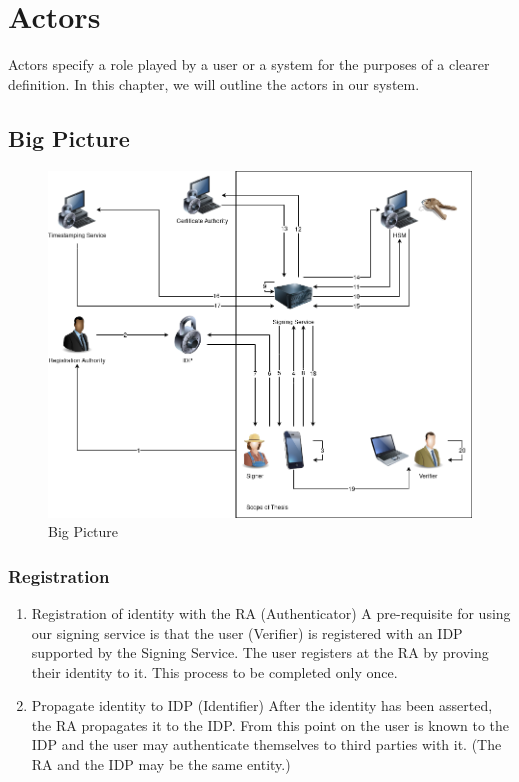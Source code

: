 \chapter{Actors}
\label{ch:actors}

Actors specify a role played by a user or a system for the purposes of a clearer definition.
In this chapter, we will outline the actors in our system.

\begin{landscape}
    \section{Big Picture}\label{sec:big-picture}
    \begin{figure}[H]
        \begin{center}
            \includegraphics[scale=0.55]{images/BigPicture.png}
            \caption{Big Picture}
            \label{fig:bigpicture}
        \end{center}
    \end{figure}
\end{landscape}

\subsection{Registration}\label{subsec:registration}
\begin{enumerate}
    \item Registration of identity with the \gls{RA} (Authenticator) A pre-requisite for using our signing service is that the user (Verifier) is registered with an \gls{IDP} supported by the Signing Service.
    The user registers at the \gls{RA} by proving their identity to it.
    This process to be completed only once.

    \item Propagate identity to \gls{IDP} (Identifier)
    After the identity has been asserted, the \gls{RA} propagates it to the \gls{IDP}.
    From this point on the user is known to the \gls{IDP} and the user may authenticate themselves to third parties with it.
    (The \gls{RA} and the \gls{IDP} may be the same entity.)

\end{enumerate}

